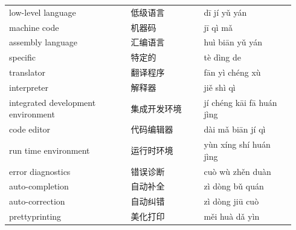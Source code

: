 \documentclass[11pt]{article}
\begin{document}
\begin{longtable}{@{}p{0.40\linewidth}p{0.24\linewidth}p{0.30\linewidth}@{}}
low-level language & 低级语言 & dī jí yǔ yán \\
machine code & 机器码 & jī qì mǎ \\
assembly language & 汇编语言 & huì biān yǔ yán \\
specific & 特定的 & tè dìng de \\
translator & 翻译程序 & fān yì chéng xù \\
interpreter & 解释器 & jiě shì qì \\
integrated development environment & 集成开发环境 & jí chéng kāi fā huán jìng \\
code editor & 代码编辑器 & dài mǎ biān jí qì \\
run time environment & 运行时环境 & yùn xíng shí huán jìng \\
error diagnostics & 错误诊断 & cuò wù zhěn duàn \\
auto-completion & 自动补全 & zì dòng bǔ quán \\
auto-correction & 自动纠错 & zì dòng jiū cuò \\
prettyprinting & 美化打印 & měi huà dǎ yìn \\
\end{longtable}
\end{document}
